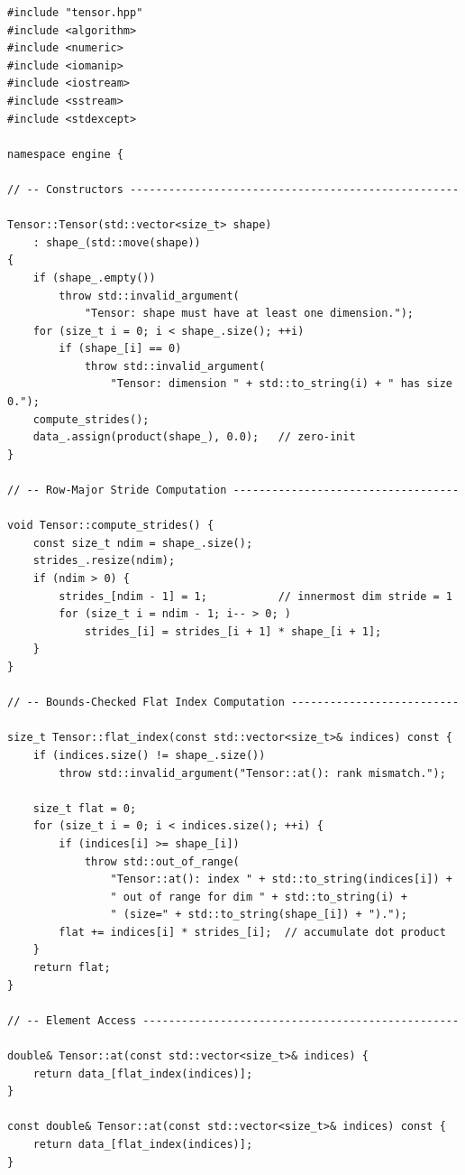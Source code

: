 \documentclass[12pt, a4paper]{article}
\begin{document}
\begin{lstlisting}[caption={\texttt{engine/tensor.cpp} - key implementation sections}]
#include "tensor.hpp"
#include <algorithm>
#include <numeric>
#include <iomanip>
#include <iostream>
#include <sstream>
#include <stdexcept>

namespace engine {

// -- Constructors ---------------------------------------------------

Tensor::Tensor(std::vector<size_t> shape)
    : shape_(std::move(shape))
{
    if (shape_.empty())
        throw std::invalid_argument(
            "Tensor: shape must have at least one dimension.");
    for (size_t i = 0; i < shape_.size(); ++i)
        if (shape_[i] == 0)
            throw std::invalid_argument(
                "Tensor: dimension " + std::to_string(i) + " has size 0.");
    compute_strides();
    data_.assign(product(shape_), 0.0);   // zero-init
}

// -- Row-Major Stride Computation -----------------------------------

void Tensor::compute_strides() {
    const size_t ndim = shape_.size();
    strides_.resize(ndim);
    if (ndim > 0) {
        strides_[ndim - 1] = 1;           // innermost dim stride = 1
        for (size_t i = ndim - 1; i-- > 0; )
            strides_[i] = strides_[i + 1] * shape_[i + 1];
    }
}

// -- Bounds-Checked Flat Index Computation --------------------------

size_t Tensor::flat_index(const std::vector<size_t>& indices) const {
    if (indices.size() != shape_.size())
        throw std::invalid_argument("Tensor::at(): rank mismatch.");

    size_t flat = 0;
    for (size_t i = 0; i < indices.size(); ++i) {
        if (indices[i] >= shape_[i])
            throw std::out_of_range(
                "Tensor::at(): index " + std::to_string(indices[i]) +
                " out of range for dim " + std::to_string(i) +
                " (size=" + std::to_string(shape_[i]) + ").");
        flat += indices[i] * strides_[i];  // accumulate dot product
    }
    return flat;
}

// -- Element Access -------------------------------------------------

double& Tensor::at(const std::vector<size_t>& indices) {
    return data_[flat_index(indices)];
}

const double& Tensor::at(const std::vector<size_t>& indices) const {
    return data_[flat_index(indices)];
}


\end{lstlisting}
\end{document}
